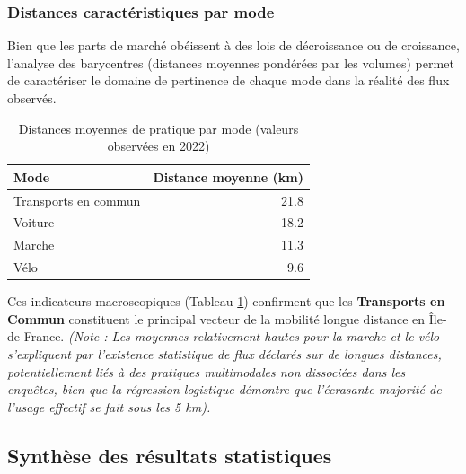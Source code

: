 \documentclass[11pt,a4paper]{article}
\begin{document}
\subsubsection{Distances caractéristiques par mode}
Bien que les parts de marché obéissent à des lois de décroissance ou de croissance, l'analyse des barycentres (distances moyennes pondérées par les volumes) permet de caractériser le domaine de pertinence de chaque mode dans la réalité des flux observés.
\begin{table}[H]
    \centering
    \caption{Distances moyennes de pratique par mode (valeurs observées en 2022)}
    \label{tab:distances_moyennes}
    \begin{tabular}{lr}
    \toprule
    \textbf{Mode} & \textbf{Distance moyenne (km)} \\
    \midrule
    Transports en commun & 21.8 \\
    Voiture               & 18.2 \\
    Marche                & 11.3 \\
    Vélo                  & 9.6 \\
    \bottomrule
    \end{tabular}
\end{table}
Ces indicateurs macroscopiques (Tableau \ref{tab:distances_moyennes}) confirment que les \textbf{Transports en Commun} constituent le principal vecteur de la mobilité longue distance en Île-de-France. \textit{(Note : Les moyennes relativement hautes pour la marche et le vélo s'expliquent par l'existence statistique de flux déclarés sur de longues distances, potentiellement liés à des pratiques multimodales non dissociées dans les enquêtes, bien que la régression logistique démontre que l'écrasante majorité de l'usage effectif se fait sous les 5 km).}
\subsection{Synthèse des résultats statistiques}
\end{document}
